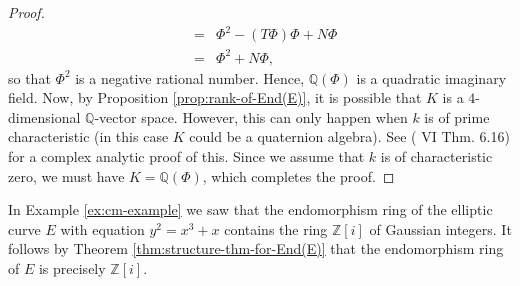 \begin{proof}
\begin{eqnarray*}
    &=&\Phi^{2} - (T\Phi)\Phi + N\Phi\\
    &=&\Phi^{2} + N\Phi,
  \end{eqnarray*}
  so that $\Phi^{2}$ is a negative rational number.  Hence, $\mathbb{Q}(\Phi)$ is a
  quadratic imaginary field.
  Now, by Proposition \ref{prop:rank-of-End(E)}, it is possible that $K$ is a
  $4$-dimensional $\mathbb{Q}$-vector space.  However, this can only happen when $k$
  is of prime characteristic (in this case $K$ could be a quaternion algebra).  See
  (\cite{silverman86} VI Thm. 6.16) for a complex analytic proof of this.  Since we
  assume that $k$ is of characteristic zero, we must have $K = \mathbb{Q}(\Phi)$,
  which completes the proof.
\end{proof}

In Example \ref{ex:cm-example} we saw that the endomorphism ring of the elliptic
curve $E$ with equation $y^{2} = x^{3} + x$ contains the ring $\mathbb{Z}[i]$ of
Gaussian integers.  It follows by Theorem \ref{thm:structure-thm-for-End(E)} that the
endomorphism ring of $E$ is precisely $\mathbb{Z}[i]$.


